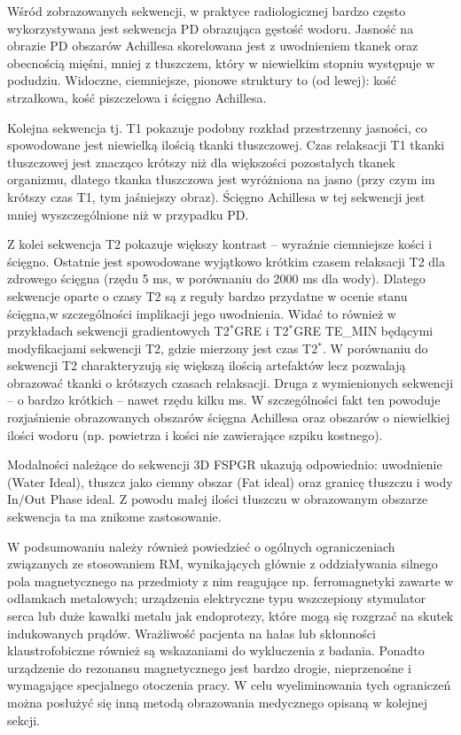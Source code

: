 Wśród zobrazowanych sekwencji, w praktyce radiologicznej bardzo często wykorzystywana jest sekwencja PD obrazująca gęstość wodoru. Jasność na obrazie PD obszarów Achillesa skorelowana jest z uwodnieniem tkanek oraz obecnością mięśni, mniej z tłuszczem, który w niewielkim stopniu występuje w podudziu. Widoczne, ciemniejsze, pionowe struktury to (od lewej): kość strzałkowa, kość piszczelowa \linebreak i ścięgno Achillesa. 

Kolejna sekwencja tj. T1 pokazuje podobny rozkład przestrzenny jasności, co spowodowane jest niewielką ilością tkanki tłuszczowej. Czas relaksacji T1 tkanki tłuszczowej jest znacząco krótszy niż dla większości pozostałych tkanek organizmu, dlatego tkanka tłuszczowa jest wyróżniona na jasno (przy czym im krótszy czas T1, tym jaśniejszy obraz). Ścięgno Achillesa w tej sekwencji jest mniej wyszczególnione niż w przypadku PD. 

Z kolei sekwencja T2 pokazuje większy kontrast -- wyraźnie ciemniejsze kości \linebreak i ścięgno. Ostatnie jest spowodowane wyjątkowo krótkim czasem relaksacji T2 dla zdrowego ścięgna (rzędu 5 ms, w porównaniu do 2000 ms dla wody). Dlatego sekwencje oparte o czasy T2 są z reguły bardzo przydatne w ocenie stanu ścięgna,\linebreak w szczególności implikacji jego uwodnienia. Widać to również w przykładach sekwencji gradientowych T2$^\ast$GRE i T2$^\ast$GRE TE\_MIN będącymi modyfikacjami sekwencji T2, gdzie mierzony jest czas T2$^\ast$. W porównaniu do sekwencji T2 charakteryzują się większą ilością artefaktów lecz pozwalają obrazować tkanki o krótszych czasach relaksacji. Druga z wymienionych sekwencji -- o bardzo krótkich -- nawet rzędu kilku ms. W szczególności fakt ten powoduje rozjaśnienie obrazowanych obszarów ścięgna Achillesa oraz obszarów o niewielkiej ilości wodoru (np. powietrza i kości nie zawierające szpiku kostnego). 

Modalności należące do sekwencji 3D FSPGR ukazują odpowiednio: uwodnienie (Water Ideal), tłuszcz jako ciemny obszar (Fat ideal) oraz granicę tłuszczu i wody In$/$Out Phase ideal. Z powodu małej ilości tłuszczu w obrazowanym obszarze sekwencja ta ma znikome zastosowanie.

W podsumowaniu należy również powiedzieć o ogólnych ograniczeniach związanych ze stosowaniem RM, wynikających głównie z oddziaływania silnego pola magnetycznego na przedmioty z nim reagujące np. ferromagnetyki zawarte w odłamkach metalowych; urządzenia elektryczne typu wszczepiony stymulator serca lub duże kawałki metalu jak endoprotezy, które mogą się rozgrzać na skutek indukowanych prądów. Wrażliwość pacjenta na hałas lub skłonności klaustrofobiczne również są wskazaniami do wykluczenia z badania. Ponadto urządzenie do rezonansu magnetycznego jest bardzo drogie, nieprzenośne i wymagające specjalnego otoczenia pracy. W celu wyeliminowania tych ograniczeń można posłużyć się inną metodą obrazowania medycznego opisaną w kolejnej sekcji. 

